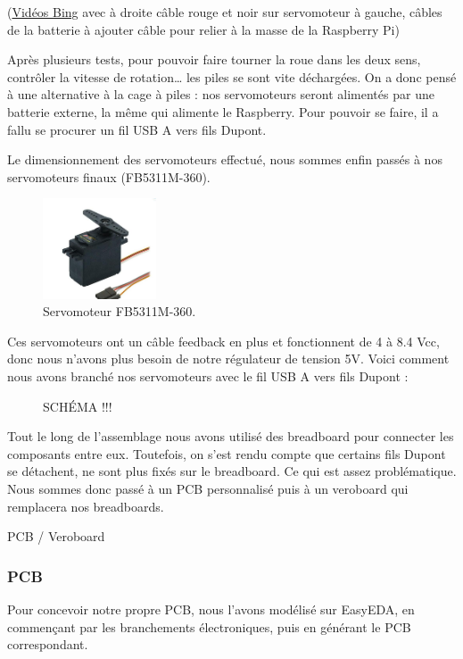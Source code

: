 \documentclass[a4paper,12pt]{report}  %
\begin{document}
(\href{https://www.bing.com/videos/riverview/relatedvideo?&q=regulador+de+5voltios+L7805&&mid=4E46E731ADB08757CF134E46E731ADB08757CF13&mmscn=mtsc&aps=13&FORM=VRDGAR}{Vidéos Bing} 
avec à droite câble rouge et noir sur servomoteur
à  gauche, câbles de la batterie 
à ajouter câble pour relier à la masse de la Raspberry Pi)

Après plusieurs tests, pour pouvoir faire tourner la roue dans les deux sens, contrôler la vitesse de rotation… les piles se sont vite déchargées. On a donc pensé à une alternative à la cage à piles : nos servomoteurs seront alimentés par une batterie externe, la même qui alimente le Raspberry. Pour pouvoir se faire, il a fallu se procurer un fil USB A vers fils Dupont.

Le dimensionnement des servomoteurs effectué, nous sommes enfin passés à nos servomoteurs finaux (FB5311M-360). \\

\begin{figure}[H]
	\centering
	\includegraphics[width=0.3\textwidth]{./attachments/moteur_servo.jpg}
	\caption{Servomoteur FB5311M-360.}
\end{figure}

Ces servomoteurs ont un câble feedback en plus et fonctionnent de 4 à 8.4 Vcc, donc nous n’avons plus besoin de notre régulateur de tension 5V. Voici comment nous avons branché nos servomoteurs avec le fil USB A vers fils Dupont : 

\begin{figure}[H]
	\centering
	\caption{SCHÉMA !!!}
\end{figure}

Tout le long de l’assemblage nous avons utilisé des breadboard pour connecter les composants entre eux. Toutefois, on s’est rendu compte que certains fils Dupont se détachent, ne sont plus fixés sur le breadboard. Ce qui est assez problématique. 
Nous sommes donc passé à un PCB personnalisé puis à un veroboard qui remplacera nos breadboards.

PCB / Veroboard

\subsubsection{PCB}
Pour concevoir notre propre PCB, nous l’avons modélisé sur EasyEDA, en commençant par les branchements électroniques, puis en générant le PCB correspondant. 
\end{document}
